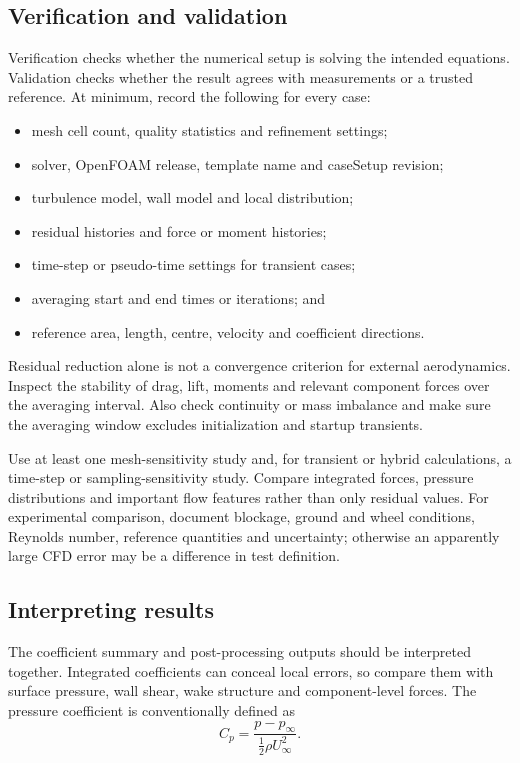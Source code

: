 \subsection{Verification and validation}

Verification checks whether the numerical setup is solving the intended equations. Validation checks whether the result agrees with measurements or a trusted reference. At minimum, record the following for every case:
\begin{itemize}
    \item mesh cell count, quality statistics and refinement settings;
    \item solver, OpenFOAM release, template name and caseSetup revision;
    \item turbulence model, wall model and local  distribution;
    \item residual histories and force or moment histories;
    \item time-step or pseudo-time settings for transient cases;
    \item averaging start and end times or iterations; and
    \item reference area, length, centre, velocity and coefficient directions.
\end{itemize}

Residual reduction alone is not a convergence criterion for external aerodynamics. Inspect the stability of drag, lift, moments and relevant component forces over the averaging interval. Also check continuity or mass imbalance and make sure the averaging window excludes initialization and startup transients.

Use at least one mesh-sensitivity study and, for transient or hybrid calculations, a time-step or sampling-sensitivity study. Compare integrated forces, pressure distributions and important flow features rather than only residual values. For experimental comparison, document blockage, ground and wheel conditions, Reynolds number, reference quantities and uncertainty; otherwise an apparently large CFD error may be a difference in test definition.

\subsection{Interpreting results}

The coefficient summary and post-processing outputs should be interpreted together. Integrated coefficients can conceal local errors, so compare them with surface pressure, wall shear, wake structure and component-level forces. The pressure coefficient is conventionally defined as
\begin{equation}
    C_p = \frac{p-p_\infty}{\frac{1}{2}\rho U_\infty^2}.
\end{equation}


